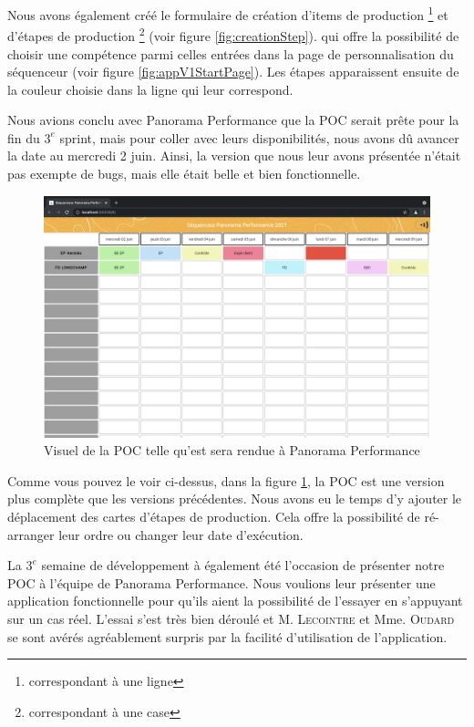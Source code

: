Nous avons également créé le formulaire de création d'items de production \footnote{correspondant à une ligne} et d'étapes de production \footnote{correspondant à une case} (voir figure \ref{fig:creationStep}). qui offre la possibilité de choisir une compétence parmi celles entrées dans la page de personnalisation du séquenceur (voir figure \ref{fig:appV1StartPage}). Les étapes apparaissent ensuite de la couleur choisie dans la ligne qui leur correspond.
\clearpage

Nous avions conclu avec Panorama Performance que la POC serait prête pour la fin du $3^{e}$ sprint, mais pour coller avec leurs disponibilités, nous avons dû avancer la date au mercredi 2 juin. Ainsi, la version que nous leur avons présentée n'était pas exempte de bugs, mais elle était belle et bien fonctionnelle.


\begin{figure}[!h]
    \centering
    \includegraphics[scale=0.28]{img/app_v3.png}
    \caption{Visuel de la POC telle qu'est sera rendue à Panorama Performance}
    \label{fig:POC}
\end{figure}


Comme vous pouvez le voir ci-dessus, dans la figure \ref{fig:POC}, la POC est une version plus complète que les versions précédentes. Nous avons eu le temps d'y ajouter le déplacement des cartes d'étapes de production. Cela offre la possibilité de ré-arranger leur ordre ou changer leur date d'exécution.\\
\hfill

La $3^{e}$ semaine de développement à également été l'occasion de présenter notre POC à l'équipe de Panorama Performance. Nous voulions leur présenter une application fonctionnelle pour qu'ils aient la possibilité de l'essayer en s'appuyant sur un cas réel. L'essai s'est très bien déroulé et M. \textsc{Lecointre} et Mme. \textsc{Oudard} se sont avérés agréablement surpris par la facilité d'utilisation de l'application.\\

